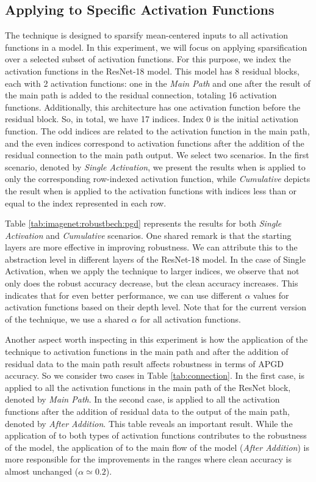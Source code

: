 \documentclass[conference]{IEEEtran}
\begin{document}
\subsection{Applying to Specific Activation Functions}\label{abl:pattern}
The \sys technique is designed to sparsify mean-centered inputs to all activation functions in a model. In this experiment, we will focus on applying sparsification over a selected subset of activation functions. For this purpose, we index the activation functions in the ResNet-18 model. This model has 8 residual blocks, each with 2 activation functions: one in the \emph{Main Path} and one after the result of the main path is added to the residual connection, totaling 16 activation functions. Additionally, this architecture has one activation function before the residual block. So, in total, we have 17 indices. Index 0 is the initial activation function. The odd indices are related to the activation function in the main path, and the even indices correspond to activation functions after the addition of the residual connection to the main path output. We select two scenarios. In the first scenario, denoted by \emph{Single Activation}, we present the results when \sys is applied to only the corresponding row-indexed activation function, while \emph{Cumulative} depicts the result when \sys is applied to the activation functions with indices less than or equal to the index represented in each row. 

Table \ref{tab:imagenet:robustbech:pgd} represents the results for both \emph{Single Activation} and \emph{Cumulative} scenarios. One shared remark is that the starting layers are more effective in improving robustness. We can attribute this to the abstraction level in different layers of the ResNet-18 model. In the case of Single Activation, when we apply the \sys technique to larger indices, we observe that not only does the robust accuracy decrease, but the clean accuracy increases. This indicates that for even better performance, we can use different $\alpha$ values for activation functions based on their depth level. Note that for the current version of the \sys technique, we use a shared $\alpha$ for all activation functions.

Another aspect worth inspecting in this experiment is how the application of the \sys technique to activation functions in the main path and after the addition of residual data to the main path result affects robustness in terms of APGD accuracy. So we consider two cases in Table \ref{tab:connection}. In the first case, \sys is applied to all the activation functions in the main path of the ResNet block, denoted by \emph{Main Path}. In the second case, \sys is applied to all the activation functions after the addition of residual data to the output of the main path, denoted by \emph{After Addition}. This table reveals an important result. While the application of \sys to both types of activation functions contributes to the robustness of the model, the application of \sys to the main flow of the model (\emph{After Addition}) is more responsible for the improvements in the ranges where clean accuracy is almost unchanged ($\alpha \simeq 0.2$).
\end{document}
